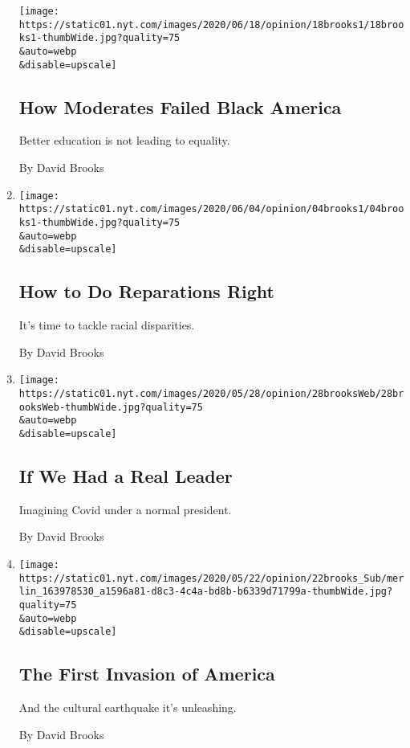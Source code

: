 \begin{enumerate}
  \texttt{[image: https://static01.nyt.com/images/2020/06/18/opinion/18brooks1/18brooks1-thumbWide.jpg?quality=75\\\&auto=webp\\\&disable=upscale]}

  \hypertarget{how-moderates-failed-black-america}{%
  \subsection{How Moderates Failed Black
  America}\label{how-moderates-failed-black-america}}

  Better education is not leading to equality.

  By David Brooks
\item
  \href{/2020/06/04/opinion/united-states-reparations.html}{}

  \texttt{[image: https://static01.nyt.com/images/2020/06/04/opinion/04brooks1/04brooks1-thumbWide.jpg?quality=75\\\&auto=webp\\\&disable=upscale]}

  \hypertarget{how-to-do-reparations-right}{%
  \subsection{How to Do Reparations
  Right}\label{how-to-do-reparations-right}}

  It's time to tackle racial disparities.

  By David Brooks
\item
  \href{/2020/05/28/opinion/coronavirus-trump.html}{}

  \texttt{[image: https://static01.nyt.com/images/2020/05/28/opinion/28brooksWeb/28brooksWeb-thumbWide.jpg?quality=75\\\&auto=webp\\\&disable=upscale]}

  \hypertarget{if-we-had-a-real-leader}{%
  \subsection{If We Had a Real Leader}\label{if-we-had-a-real-leader}}

  Imagining Covid under a normal president.

  By David Brooks
\item
  \href{/2020/05/21/opinion/us-coronavirus-history.html}{}

  \texttt{[image: https://static01.nyt.com/images/2020/05/22/opinion/22brooks\_Sub/merlin\_163978530\_a1596a81-d8c3-4c4a-bd8b-b6339d71799a-thumbWide.jpg?quality=75\\\&auto=webp\\\&disable=upscale]}

  \hypertarget{the-first-invasion-of-america}{%
  \subsection{The First Invasion of
  America}\label{the-first-invasion-of-america}}

  And the cultural earthquake it's unleashing.

  By David Brooks
\end{enumerate}

